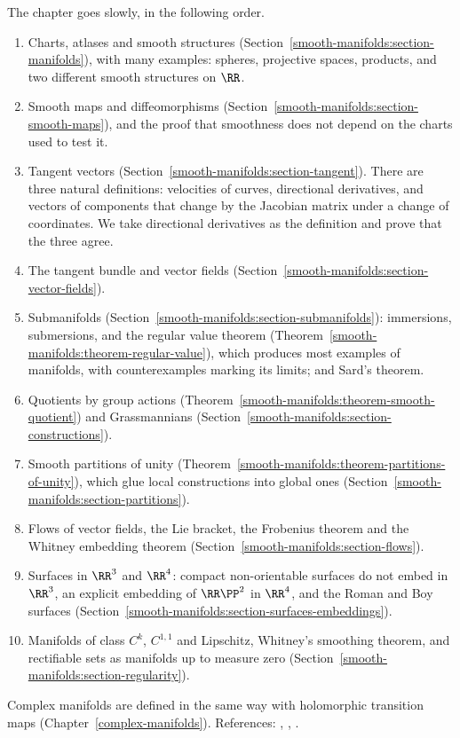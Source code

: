 The chapter goes slowly, in the following order.
\begin{enumerate}
\item Charts, atlases and smooth structures (Section~\ref{smooth-manifolds:section-manifolds}), with many examples: spheres, projective spaces, products, and two
different smooth structures on $\RR$.
\item Smooth maps and diffeomorphisms (Section~\ref{smooth-manifolds:section-smooth-maps}), and the proof that smoothness does not depend on the charts used to
test it.
\item Tangent vectors (Section~\ref{smooth-manifolds:section-tangent}). There are three natural definitions: velocities of curves, directional derivatives, and
vectors of components that change by the Jacobian matrix under a change of coordinates. We take directional derivatives as the definition and prove that the
three agree.
\item The tangent bundle and vector fields (Section~\ref{smooth-manifolds:section-vector-fields}).
\item Submanifolds (Section~\ref{smooth-manifolds:section-submanifolds}): immersions, submersions, and the regular value theorem
(Theorem~\ref{smooth-manifolds:theorem-regular-value}), which produces most examples of manifolds, with counterexamples marking its limits; and Sard's theorem.
\item Quotients by group actions (Theorem~\ref{smooth-manifolds:theorem-smooth-quotient}) and Grassmannians
(Section~\ref{smooth-manifolds:section-constructions}).
\item Smooth partitions of unity (Theorem~\ref{smooth-manifolds:theorem-partitions-of-unity}), which glue local constructions into global ones
(Section~\ref{smooth-manifolds:section-partitions}).
\item Flows of vector fields, the Lie bracket, the Frobenius theorem and the Whitney embedding theorem (Section~\ref{smooth-manifolds:section-flows}).
\item Surfaces in $\RR^3$ and $\RR^4$: compact non-orientable surfaces do not embed in $\RR^3$, an explicit embedding of $\RR\PP^2$ in $\RR^4$, and the Roman and
Boy surfaces (Section~\ref{smooth-manifolds:section-surfaces-embeddings}).
\item Manifolds of class $C^k$, $C^{1,1}$ and Lipschitz, Whitney's smoothing theorem, and rectifiable sets as manifolds up to measure zero
(Section~\ref{smooth-manifolds:section-regularity}).
\end{enumerate}
Complex manifolds are defined in the same way with holomorphic transition maps (Chapter~\ref{complex-manifolds}). References:
\cite{lee-smooth-manifolds}, \cite{warner-foundations}, \cite{hirsch-differential-topology}.

